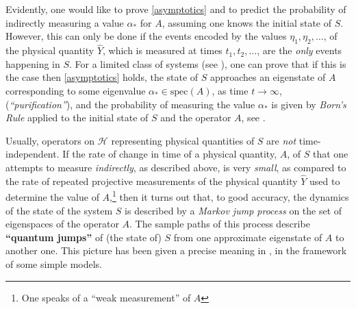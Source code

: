 \documentclass[12pt]{article}
\begin{document}
Evidently, one would like to prove \eqref{asymptotics} and to predict the probability of indirectly measuring a value $\alpha_{*}$ for $A$, assuming one knows the initial state of $S$. However, this can only be done if the events encoded by the values 
$\eta_1, \eta_2, \dots$, of the physical quantity $\hat{Y}$, which is measured at times $t_1,t_2, \dots$, are the \textit{only} events happening in $S$. For a limited class of systems (see \cite{Bauer-Bernard, BFFS}), one can prove that if this is the case then \eqref{asymptotics} holds, the state of $S$ approaches an eigenstate of $A$ corresponding to some eigenvalue $\alpha_{*}\in \text{spec}(A)$, as time $t\rightarrow \infty$, (\textit{``purification''}), and the probability of measuring the value $\alpha_{*}$ is given by \textit{Born's Rule} applied to the initial state of $S$ and the operator $A$, see \cite{BFFS}.

Usually, operators on $\mathcal{H}$ representing physical quantities of $S$ are \textit{not} time-independent. If the rate of change in time of a physical quantity, $A$, of $S$ that one attempts to measure \textit{indirectly}, as described above, is very \textit{small}, as compared to the rate of repeated projective measurements of the physical quantity $\hat{Y}$ used to determine the value of $A$,\footnote{One speaks of a ``weak measurement'' of $A$} then it turns out that, to good accuracy, the dynamics of the state of the system $S$ is described by a \textit{Markov jump process} on the set of eigenspaces of the operator 
$A$. The sample paths of this process describe {\bf{``quantum jumps''}} of (the state of) $S$ from one approximate eigenstate
 of $A$ to another one. This picture has been given a precise meaning in \cite{BFFS, BCFFS-2}, in the framework of some simple models.\\
\end{document}
